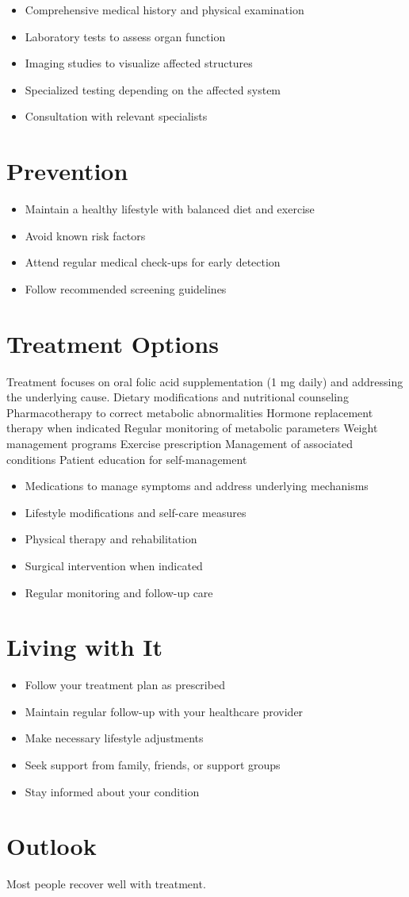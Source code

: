 \begin{itemize}[noitemsep]
  \item Comprehensive medical history and physical examination
  \item Laboratory tests to assess organ function
  \item Imaging studies to visualize affected structures
  \item Specialized testing depending on the affected system
  \item Consultation with relevant specialists
\end{itemize}
\section{Prevention}
\begin{itemize}[noitemsep]
  \item Maintain a healthy lifestyle with balanced diet and exercise
  \item Avoid known risk factors
  \item Attend regular medical check-ups for early detection
  \item Follow recommended screening guidelines
\end{itemize}
\section{Treatment Options}
Treatment focuses on oral folic acid supplementation (1 mg daily) and addressing the underlying cause. Dietary modifications and nutritional counseling Pharmacotherapy to correct metabolic abnormalities Hormone replacement therapy when indicated Regular monitoring of metabolic parameters Weight management programs Exercise prescription Management of associated conditions Patient education for self-management

\begin{itemize}[noitemsep]
  \item Medications to manage symptoms and address underlying mechanisms
  \item Lifestyle modifications and self-care measures
  \item Physical therapy and rehabilitation
  \item Surgical intervention when indicated
  \item Regular monitoring and follow-up care
\end{itemize}
\section{Living with It}
\begin{itemize}[noitemsep]
  \item Follow your treatment plan as prescribed
  \item Maintain regular follow-up with your healthcare provider
  \item Make necessary lifestyle adjustments
  \item Seek support from family, friends, or support groups
  \item Stay informed about your condition
\end{itemize}
\section{Outlook}
Most people recover well with treatment.
